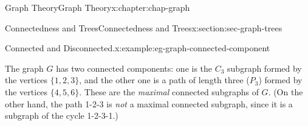 \documentclass[oneside,10pt,]{book}
\numberwithin{equation}{section}
\begin{document}
\begin{chapterptx}{Graph Theory}{}{Graph Theory}{}{}{x:chapter:chap-graph}
\begin{sectionptx}{Connectedness and Trees}{}{Connectedness and Trees}{}{}{x:section:sec-graph-trees}
\begin{example}{Connected and Disconnected.}{x:example:eg-graph-connected-component}
\begin{sidebyside}{1}{0.365}{0.365}{0}
\begin{sbspanel}{0.27}
{
}%
\end{sbspanel}%
\end{sidebyside}%
\par
The graph \(G\) has two connected components: one is the \(C_3\) subgraph formed by the vertices \(\{1,2,3\}\), and the other one is a path of length three (\(P_3\)) formed by the vertices \(\{4,5,6\}\). These are the \emph{maximal} connected subgraphs of \(G\). (On the other hand, the path 1-2-3 is \emph{not} a maximal connected subgraph, since it is a subgraph of the cycle 1-2-3-1.)%
\begin{sidebyside}{1}{0.4}{0.4}{0}%
\begin{sbspanel}{0.2}%
\end{sbspanel}
\end{sidebyside}
\end{example}
\end{sectionptx}
\end{chapterptx}
\end{document}
